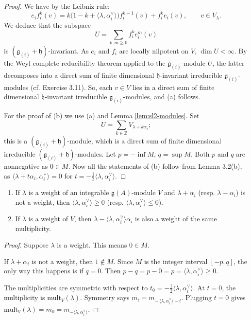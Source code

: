 \documentclass[12pt]{article}
\begin{document}
\begin{proof}
We have by the Leibniz rule:
\begin{equation}\label{eq:361}
e_i f_i^k(v) = k\bigl(1-k+\langle \lambda,\alpha_i^\vee\rangle\bigr) f_i^{k-1}(v) 
+ f_i^k e_i(v), \qquad v\in V_\lambda.
\end{equation}
We deduce that the subspace
\[
U=\sum_{k,m\ge0} f_i^k e_i^m(v)
\]
is $(\mathfrak{g}_{(i)}+\mathfrak{h})$-invariant. As $e_i$ and $f_i$ are locally nilpotent on $V$, $\dim U < \infty$.
By the Weyl complete reducibility theorem applied to the $\mathfrak{g}_{(i)}$-module $U$, the latter decomposes into a direct sum of finite dimensional 
$\mathfrak{h}$-invariant irreducible $\mathfrak{g}_{(i)}$-modules (cf. Exercise 3.11). So, each $v\in V$ lies in a direct sum of finite dimensional 
$\mathfrak{h}$-invariant irreducible $\mathfrak{g}_{(i)}$-modules, and (a) follows.

For the proof of (b) we use (a) and Lemma \ref{lem:sl2-modules}. Set 
\[
U=\sum_{k\in\mathbb{Z}} V_{\lambda+k\alpha_i};
\]
this is a $(\mathfrak{g}_{(i)}+\mathfrak{h})$-module, which is a direct sum of finite dimensional irreducible $(\mathfrak{g}_{(i)}+\mathfrak{h})$-modules. 
Let $p=-\inf M$, $q=\sup M$. Both $p$ and $q$ are nonnegative as $0\in M$. Now all the statements of (b) follow from Lemma 3.2(b), as 
$\langle \lambda+t\alpha_i,\alpha_i^\vee\rangle=0$ for $t=-\tfrac{1}{2}\langle\lambda,\alpha_i^\vee\rangle$.
\end{proof}

\begin{corollary}
\leavevmode
\begin{enumerate}[label=(\alph*)]
\item If $\lambda$ is a weight of an integrable $\mathfrak{g}(A)$-module $V$ and $\lambda+\alpha_i$ 
(resp. $\lambda-\alpha_i$) is not a weight, then $\langle \lambda,\alpha_i^\vee\rangle \ge 0$ 
(resp. $\langle \lambda,\alpha_i^\vee\rangle \le 0$).

\item If $\lambda$ is a weight of $V$, then $\lambda - \langle \lambda,\alpha_i^\vee\rangle \alpha_i$ 
is also a weight of the same multiplicity.
\end{enumerate}
\end{corollary}

\begin{proof}

Suppose $\lambda$ is a weight. This means $0\in M$.

If $\lambda+\alpha_i$ is not a weight, then $1\notin M$. Since $M$ is the integer interval $[-p,q]$, the only way this happens is if $q=0$. Then
$p - q = p - 0 = p = \langle \lambda,\alpha_i^\vee\rangle \ge 0$.

The multiplicities are symmetric with respect to $t_0 = -\tfrac{1}{2}\langle \lambda,\alpha_i^\vee\rangle$. At $t=0$, the multiplicity is $\mathrm{mult}_V(\lambda)$. Symmetry says $m_t = m_{-\,\langle \lambda,\alpha_i^\vee\rangle - t}$. Plugging $t=0$ gives $\mathrm{mult}_V(\lambda) = m_0 = m_{-\langle \lambda,\alpha_i^\vee\rangle}$.
\end{proof}
\end{document}
